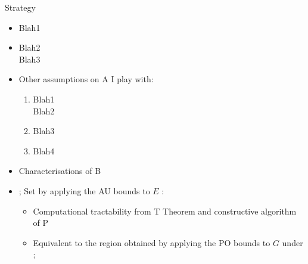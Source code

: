 \documentclass[10pt,xcolor=table]{beamer}
\newcommand{\Blue}{\color[rgb]{0,0,1}}
\newcommand\tikzmark[2][]{%
    \tikz[remember picture with id=#2] #1;}
\begin{document}
    \begin{frame}{Strategy}
        \small
        \begin{itemize}
            \item Blah1
            \vspace{0.2cm}
            \item Blah2\\
            Blah3
            \vspace{0.2cm}
            \item Other assumptions on {\Blue A} I play with: 
            \begin{enumerate}[i]
                \item Blah1\\
                Blah2
                \item Blah3
                \item Blah4
            \end{enumerate}
            \vspace{0.2cm}
            \item Characterisations of B
            \vspace{0.2cm}
            \item \tikzmark{lefta} {\Blue Set} by applying the AU bounds to {\Blue $E$} {} {}:           
            \begin{itemize}
                \item Computational tractability from T Theorem and constructive algorithm of P
                \item Equivalent to the region obtained by applying the PO bounds to {\Blue $G$} under {\color{orange}{i}} {\color{magenta}{(i-iii)}}\hfill\tikzmark{righta}
            \end{itemize}

        \end{itemize}
    \end{frame}
\end{document}
